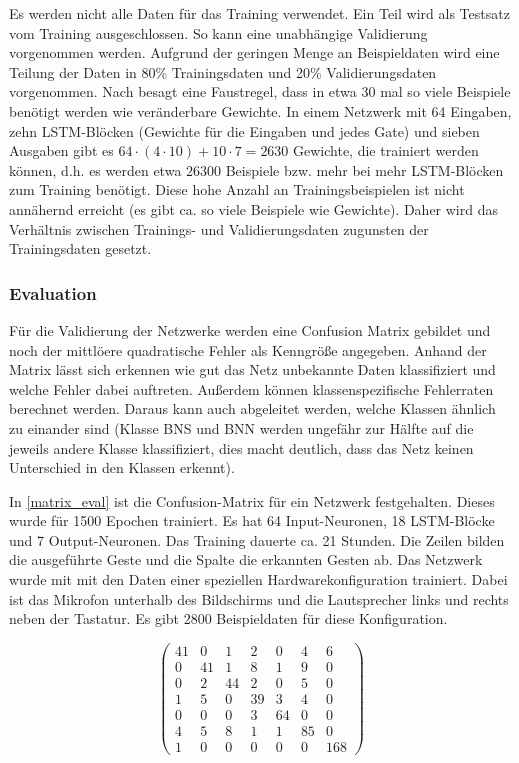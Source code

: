Es werden nicht alle Daten für das Training verwendet. Ein Teil wird als
Testsatz vom Training ausgeschlossen. So kann eine unabhängige Validierung
vorgenommen werden. Aufgrund der geringen Menge an Beispieldaten wird eine
Teilung der Daten in 80\% Trainingsdaten und 20\% Validierungsdaten vorgenommen.
Nach \cite{NNFAQ} besagt eine Faustregel, dass in etwa 30 mal so viele Beispiele
benötigt werden wie veränderbare Gewichte. In einem Netzwerk mit 64 Eingaben,
zehn \ac{LSTM}-Blöcken (Gewichte für die Eingaben und jedes Gate) und sieben
Ausgaben gibt es $64\cdot(4\cdot10)+10\cdot7 = 2630$ Gewichte, die trainiert
werden können, d.h. es werden etwa $26300$ Beispiele bzw. mehr bei mehr
\ac{LSTM}-Blöcken zum Training benötigt. Diese hohe Anzahl an
Trainingsbeispielen ist nicht annähernd erreicht (es gibt ca. so viele Beispiele
wie Gewichte). Daher wird das Verhältnis zwischen Trainings- und
Validierungsdaten zugunsten der Trainingsdaten gesetzt.

\subsubsection{Evaluation}
Für die Validierung der Netzwerke werden eine Confusion Matrix gebildet und noch
der mittlöere quadratische Fehler als Kenngröße angegeben. Anhand der Matrix
lässt sich erkennen wie gut das Netz unbekannte Daten klassifiziert und welche
Fehler dabei auftreten. Außerdem können klassenspezifische Fehlerraten berechnet
werden. Daraus kann auch abgeleitet werden, welche Klassen ähnlich zu einander
sind (Klasse \ac{BNS} und \ac{BNN} werden ungefähr zur Hälfte auf die jeweils
andere Klasse klassifiziert, dies macht deutlich, dass das Netz keinen
Unterschied in den Klassen erkennt).

In \autoref{matrix_eval} ist die Confusion-Matrix für ein Netzwerk festgehalten.
Dieses wurde für 1500 Epochen trainiert. Es hat 64 Input-Neuronen, 18
\ac{LSTM}-Blöcke und 7 Output-Neuronen. Das Training dauerte ca. 21 Stunden. Die
Zeilen bilden die ausgeführte Geste und die Spalte die erkannten Gesten ab. Das
Netzwerk wurde mit mit den Daten einer speziellen Hardwarekonfiguration
trainiert. Dabei ist das Mikrofon unterhalb des Bildschirms und die Lautsprecher
links und rechts neben der Tastatur. Es gibt 2800 Beispieldaten für diese Konfiguration. 

\begin{center}
\begin{equation}
\label{matrix_eval}
\begin{pmatrix}
41 & 0 & 1 & 2 & 0 & 4 & 6\\
0 & 41 & 1 & 8 & 1 & 9 & 0\\
0 & 2 & 44 & 2 & 0 & 5 & 0 \\
1 & 5 & 0 & 39 & 3 & 4 & 0 \\
0 & 0 & 0 & 3 & 64 & 0 & 0 \\
4 & 5 & 8 & 1 & 1 & 85 & 0 \\
1 & 0 & 0 & 0 & 0 & 0 & 168
\end{pmatrix}
\end{equation}
\end{center}

